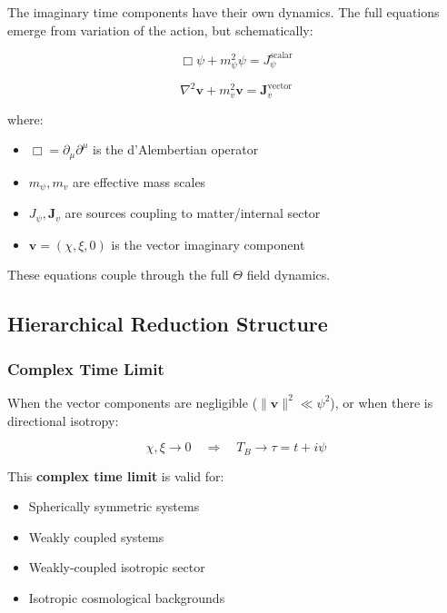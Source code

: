 The imaginary time components have their own dynamics. The full equations emerge from variation of the action, but schematically:

\begin{equation}
\label{eq:canonical:psi_dynamics}
\Box \psi + m_\psi^2 \psi = J_\psi^{\text{scalar}}
\end{equation}

\begin{equation}
\label{eq:canonical:vec_dynamics}
\nabla^2 \mathbf{v} + m_v^2 \mathbf{v} = \mathbf{J}_v^{\text{vector}}
\end{equation}

\noindent where:
\begin{itemize}
    \item $\Box = \partial_\mu\partial^\mu$ is the d'Alembertian operator
    \item $m_\psi, m_v$ are effective mass scales
    \item $J_\psi, \mathbf{J}_v$ are sources coupling to matter/internal sector
    \item $\mathbf{v} = (\chi, \xi, 0)$ is the vector imaginary component
\end{itemize}

These equations couple through the full $\Theta$ field dynamics.

\subsection{Hierarchical Reduction Structure}

\subsubsection{Complex Time Limit}

When the vector components are negligible ($\|\mathbf{v}\|^2 \ll \psi^2$), or when there is directional isotropy:

\begin{equation}
\label{eq:canonical:complex_limit}
\boxed{\chi, \xi \to 0 \quad \Rightarrow \quad T_B \to \tau = t + i\psi}
\end{equation}

This \textbf{complex time limit} is valid for:
\begin{itemize}
    \item Spherically symmetric systems
    \item Weakly coupled systems
    \item Weakly-coupled isotropic sector
    \item Isotropic cosmological backgrounds
\end{itemize}

